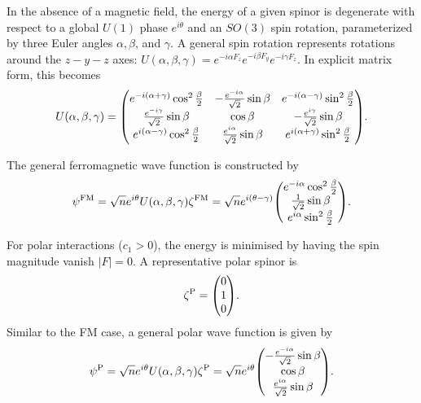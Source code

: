 In the absence of a magnetic field, the energy of a given spinor is degenerate
with respect to a global \(U(1)\) phase \(e^{i\theta}\) and an \(SO(3)\) spin
rotation, parameterized by three Euler angles \(\alpha, \beta \),
and \(\gamma \).
A general spin rotation represents rotations around the \(z-y-z\) axes:
\(U(\alpha, \beta, \gamma) = e^{-i\alpha F_z}e^{-i\beta F_y}e^{-i\gamma F_z}\).
In explicit matrix form, this becomes
\begin{equation}
    U(\alpha, \beta, \gamma) = \mqty(
    e^{-i(\alpha + \gamma)}\cos^2\frac{\beta}{2} &
    -\frac{e^{-i\alpha}}{\sqrt{2}}\sin\beta &
    e^{-i(\alpha - \gamma)}\sin^2\frac{\beta}{2} \\
    \frac{e^{-i\gamma}}{\sqrt{2}}\sin\beta &
    \cos\beta &
    -\frac{e^{i\gamma}}{\sqrt{2}}\sin\beta \\
    e^{i(\alpha - \gamma)}\cos^2\frac{\beta}{2} &
    \frac{e^{i\alpha}}{\sqrt{2}}\sin\beta &
    e^{i(\alpha + \gamma)}\sin^2\frac{\beta}{2}
    ).
\end{equation}

The general ferromagnetic wave function is constructed by
\begin{equation}\label{eq: FM-representative-spinor}
    \psi^\mathrm{FM} =
    \sqrt{n}e^{i\theta}U(\alpha, \beta, \gamma)\zeta^\mathrm{FM} =
    \sqrt{n}e^{i(\theta - \gamma)}\mqty(
    e^{-i\alpha}\cos^2\frac{\beta}{2} \\
    \frac{1}{\sqrt{2}}\sin\beta \\
    e^{i\alpha}\sin^2\frac{\beta}{2}
    ).
\end{equation}

For polar interactions (\(c_1 > 0\)), the energy is minimised by having the
spin magnitude vanish \(|F|=0\).
A representative polar spinor is
\begin{equation}\label{eq: EAP-spinor}
    \zeta^\mathrm{P} = \mqty(0 \\ 1 \\ 0).
\end{equation}
Similar to the FM case, a general polar wave function is given by
\begin{equation}\label{eq: polar-representative-spinor}
    \psi^\mathrm{P} =
    \sqrt{n}e^{i\theta}U(\alpha, \beta, \gamma)\zeta^\mathrm{P} =
    \sqrt{n}e^{i\theta}\mqty(
    -\frac{e^{-i\alpha}}{\sqrt{2}}\sin\beta \\
    \cos\beta \\
    \frac{e^{i\alpha}}{\sqrt{2}}\sin\beta
    ).
\end{equation}

